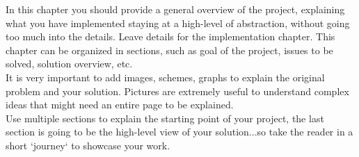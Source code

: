 In this chapter you should provide a general overview of the project, explaining what you have implemented staying at a high-level of abstraction, without going too much into the details. Leave details for the implementation chapter. This chapter can be organized in sections, such as goal of the project, issues to be solved, solution overview, etc.\\It is very important to add images, schemes, graphs to explain the original problem and your solution. Pictures are extremely useful to understand complex ideas that might need an entire page to be explained.\\Use multiple sections to explain the starting point of your project, the last section is going to be the high-level view of your solution...so take the reader in a short `journey` to showcase your work.